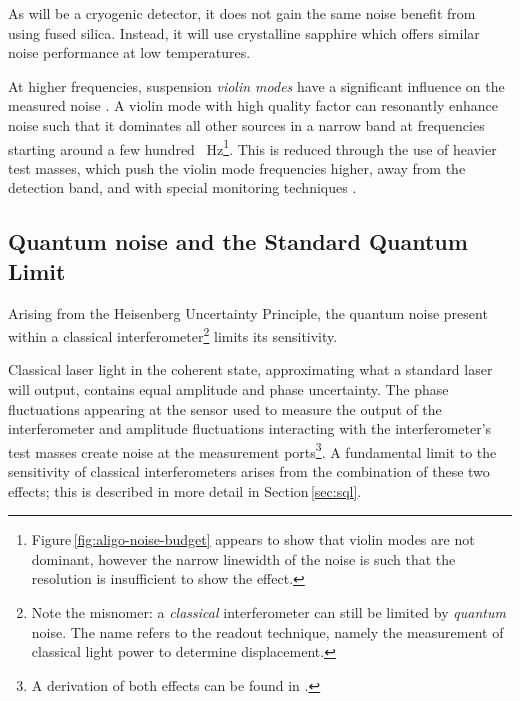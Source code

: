 As \KAGRA{} will be a cryogenic detector, it does not gain the same noise benefit from using fused silica. Instead, it will use crystalline sapphire which offers similar noise performance at low temperatures.

At higher frequencies, suspension \emph{violin modes} have a significant influence on the measured noise \cite{Robertson2002}. A violin mode with high quality factor can resonantly enhance noise such that it dominates all other sources in a narrow band at frequencies starting around a few hundred \SI{}{\hertz}\footnote{Figure\,\ref{fig:aligo-noise-budget} appears to show that violin modes are not dominant, however the narrow linewidth of the noise is such that the resolution is insufficient to show the effect.}. This is reduced through the use of heavier test masses, which push the violin mode frequencies higher, away from the detection band, and with special monitoring techniques \cite{Sorazu2010}.

\subsection{\label{sec:quantum-noise}Quantum noise and the Standard Quantum Limit}
Arising from the Heisenberg Uncertainty Principle, the quantum noise present within a classical interferometer\footnote{Note the misnomer: a \emph{classical} interferometer can still be limited by \emph{quantum} noise. The name refers to the readout technique, namely the measurement of classical light power to determine displacement.} limits its sensitivity.

Classical laser light in the coherent state, approximating what a standard laser will output, contains equal amplitude and phase uncertainty. The phase fluctuations appearing at the sensor used to measure the output of the interferometer and amplitude fluctuations interacting with the interferometer's test masses create noise at the measurement ports\footnote{A derivation of both effects can be found in \cite{Danilishin2012}.}. A fundamental limit to the sensitivity of classical interferometers arises from the combination of these two effects; this is described in more detail in Section\,\ref{sec:sql}.

